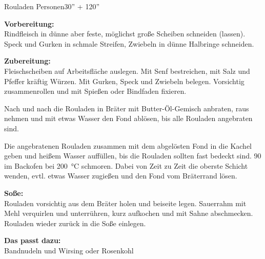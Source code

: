 \begin{MyRecipe}{Rouladen}{ Personen}{30'' + 120''}


\textbf{Vorbereitung:}\\
Rindfleisch in dünne aber feste, möglichst große Scheiben schneiden (lassen).\\
Speck und Gurken in schmale Streifen, Zwiebeln in dünne Halbringe schneiden.\par\bigskip


\textbf{Zubereitung:}\\
Fleischscheiben auf Arbeitsfläche auslegen. Mit Senf bestreichen, mit Salz und Pfeffer kräftig Würzen. Mit Gurken, Speck und Zwiebeln belegen. Vorsichtig zusammenrollen und mit Spießen oder Bindfaden fixieren.\par
Nach und nach die Rouladen in Bräter mit Butter-Öl-Gemisch anbraten, raus nehmen und mit etwas Wasser den Fond ablösen, bis alle Rouladen angebraten sind.\par
Die angebratenen Rouladen zusammen mit dem abgelösten Fond in die Kachel geben und heißem Wasser auffüllen, bis die Rouladen sollten fast bedeckt sind. \SI{90}{\min} im Backofen bei \SI{200}{\degreeCelsius} schmoren. Dabei von Zeit zu Zeit die oberste Schicht wenden, evtl. etwas Wasser zugießen und den Fond vom Bräterrand lösen.\par\bigskip


\textbf{Soße:}\\
Rouladen vorsichtig aus dem Bräter holen und beiseite legen. Sauerrahm mit Mehl verquirlen und unterrühren, kurz aufkochen und mit Sahne abschmecken. Rouladen wieder zurück in die Soße einlegen.\par\bigskip


\textbf{Das passt dazu:}\\
Bandnudeln und Wirsing oder Rosenkohl

\end{MyRecipe}